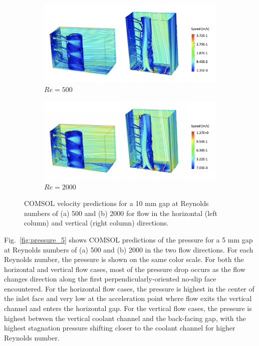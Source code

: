 \begin{figure}[!htb]
\centering
\begin{subfigure}{\textwidth}
  \centering
  \includegraphics[width=0.8\linewidth]{figs/Re500_cm1_U.png}
  \caption{\(Re=500\)}
\end{subfigure}
\begin{subfigure}{\textwidth}
  \centering
  \includegraphics[width=0.8\linewidth]{figs/Re2000_cm1_U.png}
  \caption{\(Re=2000\)}
\end{subfigure}
\caption{COMSOL velocity predictions for a 10 \si{\milli\meter} gap at Reynolds numbers of (a) 500 and (b) 2000 for flow in the horizontal (left column) and vertical (right column) directions.}
\label{fig:velocity_10}
\end{figure}

Fig.\ \ref{fig:pressure_5} shows COMSOL predictions of the pressure for a 5 \si{\milli\meter} gap at Reynolds numbers of (a) 500 and (b) 2000 in the two flow directions. For each Reynolds number, the pressure is shown on the same color scale. For both the horizontal and vertical flow cases, most of the pressure drop occurs as the flow changes direction along the first perpendicularly-oriented no-slip face encountered. For the horizontal flow cases, the pressure is highest in the center of the inlet face and very low at the acceleration point where flow exits the vertical channel and enters the horizontal gap. For the vertical flow cases, the pressure is highest between the vertical coolant channel and the back-facing gap, with the highest stagnation pressure shifting closer to the coolant channel for higher Reynolds number.


